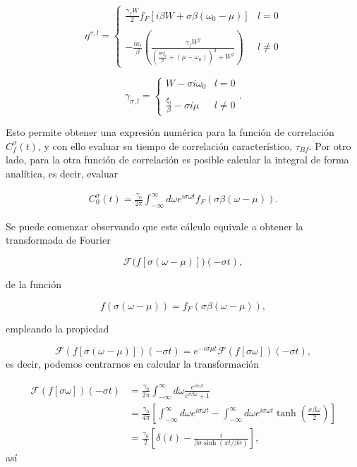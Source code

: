 \begin{appendixs}
\begin{equation*}
    \eta^{\sigma,l} = \left\{ \begin{array}{lc} \frac{\gamma_{f}W}{2} f_{F}[i\beta W + \sigma \beta (\omega_{0}-\mu)]  & l = 0 \\ \\ - \frac{i\kappa_{l}}{\beta} \left(\frac{\gamma_{f}W^{2}}{ (\frac{i\sigma \xi_{l}}{\beta} + (\mu-\omega_{0}))^{2} + W^{2} } \right) &  l \neq 0 \end{array} \right.
\end{equation*}

\begin{equation*}
    \gamma_{\sigma,l} =  \left\{ \begin{array}{lc} W- \sigma i \omega_{0}  & l = 0 \\ \\ \frac{\xi_{l}}{\beta} - \sigma i \mu &  l \neq 0 \end{array} \right..
\end{equation*}

Esto permite obtener una expresión numérica para la función de correlación $C^{\sigma}_{f}(t)$, y con ello evaluar su tiempo de correlación característico, $\tau_{Bf}$. Por otro lado, para la otra función de correlación es posible calcular la integral de forma analítica, es decir, evaluar

\begin{align*}
       C_{0}^{\sigma}(t) = \frac{\gamma_{0}}{2\pi} \int_{-\infty}^{\infty} d\omega e^{i\sigma \omega t }f_{F}(\sigma \beta (\omega -  \mu)).
\end{align*}    

Se puede comenzar observando que este cálculo equivale a obtener la transformada de Fourier 

\[
\mathcal{F}\big(f[\sigma (\omega - \mu)]\big)(-\sigma t),
\]

de la función 

\[
f(\sigma(\omega-\mu)) = f_{F}(\sigma \beta (\omega-\mu)),
\]

empleando la propiedad

\begin{equation*}
\mathcal{F}(f[\sigma (\omega - \mu)])(-\sigma t) = e^{-i \sigma \mu t}\mathcal{F}(f[\sigma \omega])(-\sigma t),
\end{equation*}
es decir, podemos centrarnos en calcular la transformación

\begin{align*}
    \mathcal{F}(f[\sigma \omega])(-\sigma t) &= \frac{\gamma_{0}}{2\pi} \int_{-\infty}^{\infty} d\omega \frac{e^{i\sigma \omega t}}{e^{\sigma \beta \omega} +1 } \\
        & = \frac{\gamma_{0}}{4\pi} \left[\int_{-\infty}^{\infty}d \omega e^{i\sigma \omega t} - \int_{-\infty}^{\infty}d\omega e^{i\sigma \omega t} \tanh \left(\frac{ \sigma \beta \omega }{2} \right)   \right] \\
        & =  \frac{\gamma_{0}}{2} \left[\delta(t) - \frac{i}{\beta \sigma \sinh(\pi t/\beta \sigma)} \right],
\end{align*}
así


\end{appendixs}
